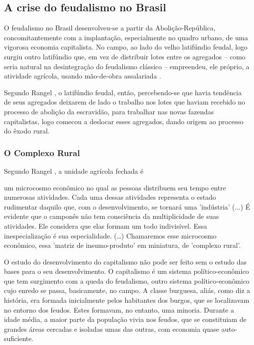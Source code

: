 \documentclass[
	12pt,				%
	oneside,			%
	a4paper,			%
	chapter=TITLE,		%
	section=TITLE,		%
	english,			%
	brazil				%
	]{abntex2}
\begin{document}
\begin{refsection}
\hypertarget{a-crise-do-feudalismo-no-brasil}{%
\subsection{A crise do feudalismo no Brasil}\label{a-crise-do-feudalismo-no-brasil}}

O feudalismo no Brasil desenvolveu-se a partir da Abolição-República,
concomitantemente com a implantação, especialmente no quadro urbano, de uma
vigorosa economia capitalista. No campo, ao lado do velho latifúndio feudal,
logo surgiu outro latifúndio que, em vez de distribuir lotes entre os agregados
-- como seria natural na desintegração do feudalismo clássico -- empreendeu, ele
próprio, a atividade agrícola, usando mão-de-obra assalariada \autocite[
738-739]{rangel1989}.

Segundo Rangel \autocite*[739]{rangel1989}, o latifúndio feudal, então, percebendo-se
que havia tendência de seus agregados deixarem de lado o trabalho nos lotes
que haviam recebido no processo de abolição da escravidão, para trabalhar nas
novas fazendas capitalistas, logo comecou a deslocar esses agregados, dando
origem ao processo do êxodo rural.

\hypertarget{o-complexo-rural}{%
\subsubsection{O Complexo Rural}\label{o-complexo-rural}}

Segundo Rangel \autocite*[p.98]{rangel1956}, a unidade agrícola fechada é
\begin{citacao}
um microcosmo econômico no qual as pessoas distribuem seu tempo entre numerosas
atividades. Cada uma dessas atividades representa o estado rudimentar daquilo
que, com o desenvolvimento, se tornará uma 'indústria' (...) É evidente que o
camponês não tem consciência da multiplicidade de suas atividades. Ele considera
que elas formam um todo indivisível. Essa inespecialização é sua especialidade.
(\ldots) Chamaremos esse microcosmo econômico, essa 'matriz de insumo-produto' em
miniatura, de 'complexo rural'.
\end{citacao}
O estudo do desenvolvimento do capitalismo não pode ser feito sem o estudo das
bases para o seu desenvolvimento. O capitalismo é um sistema político-econômico
que tem surgimento com a queda do feudalismo, outro sistema político-econômico
cujo enredo se passa, basicamente, no campo. A classe burguesa, aliás, como diz
a história, era formada inicialmente pelos habitantes dos burgos, que se
localizavam no entorno dos feudos. Estes formavam, no entanto, uma minoria.
Durante a idade média, a maior parte da população vivia nos feudos, que se
constituiam de grandes áreas cercadas e isoladas umas das outras, com economia
quase auto-suficiente.


\end{refsection}
\end{document}
